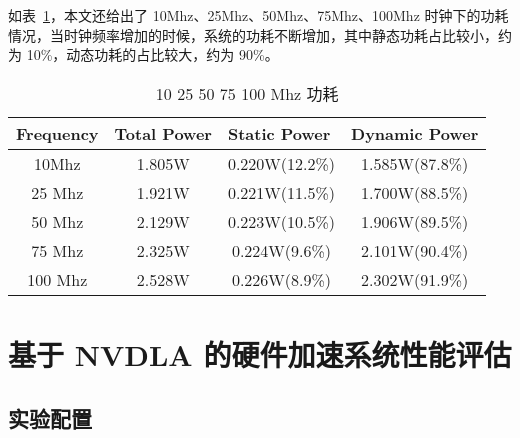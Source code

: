 如表~\ref{tab:10-100 Mhz Power}，本文还给出了 10Mhz、25Mhz、50Mhz、75Mhz、100Mhz 时钟下的功耗情况，当时钟频率增加的时候，系统的功耗不断增加，其中静态功耗占比较小，约为 10\%，动态功耗的占比较大，约为 90\%。

\begin{table}[!htbp]
    \caption{10 25 50 75 100 Mhz 功耗}
    \label{tab:10-100 Mhz Power}
    \centering
    \footnotesize%
    \setlength{\tabcolsep}{4pt}%
    \renewcommand{\arraystretch}{1.2}%
    \begin{tabular}{cccc}
        \toprule
        \multicolumn{1}{l}{\textbf{Frequency}} & \multicolumn{1}{l}{\textbf{Total Power}} & \multicolumn{1}{l}{\textbf{Static Power}} & \multicolumn{1}{l}{\textbf{Dynamic Power}} \\
        \midrule
        10Mhz                                  & 1.805W                                   & 0.220W(12.2\%)                            & 1.585W(87.8\%)                             \\
        25 Mhz                                 & 1.921W                                   & 0.221W(11.5\%)                            & 1.700W(88.5\%)                             \\
        50 Mhz                                 & 2.129W                                   & 0.223W(10.5\%)                            & 1.906W(89.5\%)                             \\
        75 Mhz                                 & 2.325W                                   & 0.224W(9.6\%)                             & 2.101W(90.4\%)                             \\
        100 Mhz                                & 2.528W                                   & 0.226W(8.9\%)                             & 2.302W(91.9\%)                             \\
        \bottomrule                   
    \end{tabular}
\end{table}

\section{基于 NVDLA 的硬件加速系统性能评估}

\subsection{实验配置}

